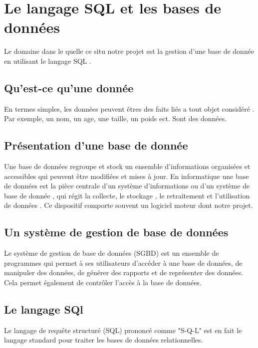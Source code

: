 \documentclass[oneside,13pt,a4paper]{report}
\begin{document}

    \chapter{Le langage SQL et les bases de données}
    
        Le domaine dans le quelle ce situ notre projet est la gestion d’une base de donnée en utilisant le langage SQL . 

        \section{Qu’est-ce qu’une donnée}

            En termes simples, les données peuvent êtres des faits liés a tout objet considéré .
            Par exemple, un nom, un age, une taille, un poids ect. Sont des données.

        \section{Présentation d’une base de donnée}

            Une base de données regroupe et stock un ensemble d’informations organisées et accessibles qui peuvent être modifiées et mises à jour. En informatique une base de données est la pièce centrale d’un système d’informations ou d’un système de base de donnée , qui régit la collecte, le stockage , le retraitement et l’utilisation de données . Ce dispositif comporte souvent un logiciel moteur dont notre projet.

        \section{Un système de gestion de base de données}

            Le système de gestion de base de données (SGBD) est un ensemble de programmes qui permet à ses utilisateurs d'accéder à une base de données, de manipuler des données, de générer des rapports et de représenter des données.
            Cela permet également de contrôler l'accès à la base de données.

        \section{Le langage SQl}

            Le langage de requête structuré (SQL) prononcé comme "S-Q-L" est en fait le langage standard pour traiter les bases de données relationnelles.
\end{document}
